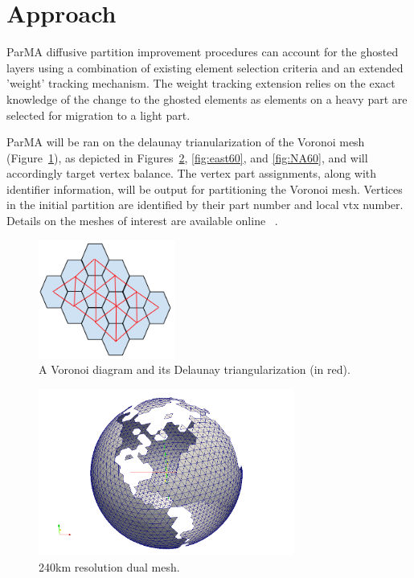 \documentclass[a4paper]{article}
\begin{document}
\section{Approach}

ParMA diffusive partition improvement procedures can account for the ghosted layers using a combination of existing element selection criteria and an extended 'weight' tracking mechanism.  The weight tracking extension relies on the exact knowledge of the change to the ghosted elements as elements on a heavy part are selected for migration to a light part.

ParMA will be ran on the delaunay trianularization of the Voronoi mesh (Figure~\ref{fig:delaunay}), as depicted in Figures~\ref{fig:NA240}, \ref{fig:east60}, and \ref{fig:NA60}, and will accordingly target vertex balance.  The vertex part assignments, along with identifier information, will be output for partitioning the Voronoi mesh. Vertices in the initial partition are identified by their part number and local vtx number.  Details on the meshes of interest are available online ~\cite{climateMesh}. 

\begin{figure} 
\centering
\includegraphics[width=0.4\textwidth]{ghostingOwnershipFig1.png}
\caption{\label{fig:delaunay} A Voronoi diagram and its Delaunay triangularization (in red).}
\end{figure}

\begin{figure}
\centering
\includegraphics[width=0.75\textwidth]{ocean_QU_240kmNA.png}
\caption{\label{fig:NA240} 240km resolution dual mesh.}
\end{figure}
\end{document}
